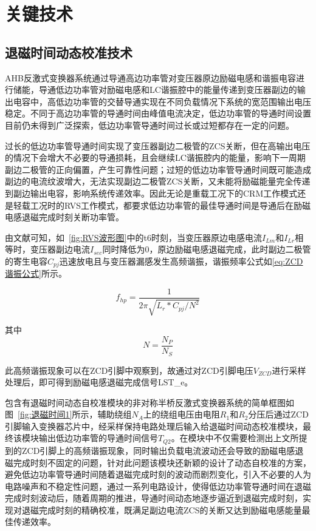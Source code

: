 \section{关键技术}

\subsection{退磁时间动态校准技术}

AHB反激式变换器系统通过导通高边功率管对变压器原边励磁电感和谐振电容进行储能，导通低边功率管对励磁电感和LC谐振腔中的能量传递到变压器副边的输出电容中，高低边功率管的交替导通实现在不同负载情况下系统的宽范围输出电压稳定。不同于高边功率管的导通时间由峰值电流决定，低边功率管的导通时间设置目前仍未得到广泛探索，低边功率管导通时间过长或过短都存在一定的问题。

过长的低边功率管导通时间实现了变压器副边二极管的ZCS关断，但在高输出电压的情况下会增大不必要的导通损耗，且会继续LC谐振腔内的能量，影响下一周期副边二极管的正向偏置，产生可靠性问题；过短的低边功率管导通时间既可能造成副边的电流纹波增大，无法实现副边二极管ZCS关断，又未能将励磁能量完全传递到副边输出电容，影响系统传递效率。因此无论是重载工况下的CRM工作模式还是轻载工况时的RVS工作模式，都要求低边功率管的最佳导通时间是导通后在励磁电感退磁完成时刻关断功率管。

由文献可知，如~\ref{fig:RVS波形图}中的t6时刻，当变压器原边电感电流$I_{Lm}$和$I_{Lr}$相等时，变压器副边电流$I_{sec}$同时降低为0，原边励磁电感退磁完成，此时副边二极管的寄生电容$C_{pj}$迅速放电且与变压器漏感发生高频谐振，谐振频率公式如\eqref{eq:ZCD谐振公式}所示。

\begin{equation}
    \label{eq:ZCD谐振公式}
    f_{hp} = \frac{1}{2\pi \sqrt{L_r * C_{pj}/N^2}}
\end{equation}

其中 
\begin{equation}
    \label{eq:变压器匝比}
    N=\frac{N_P}{N_S}
\end{equation}

此高频谐振现象可以在ZCD引脚中观察到，故通过对ZCD引脚电压$V_{ZCD}$进行采样处理后，即可得到励磁电感退磁完成信号LST\_e。

包含有退磁时间动态自校准模块的非对称半桥反激式变换器系统的简单框图如图~\ref{fig:退磁时间1}所示，辅助绕组$N_A$上的绕组电压由电阻$R_1$和$R_2$分压后通过ZCD引脚输入变换器芯片中，经采样保持电路处理后输入给退磁时间动态校准模块，最终该模块输出低边功率管的导通时间信号$T_{Q2}$。在模块中不仅需要检测出上文所提到的ZCD引脚上的高频谐振现象，同时输出负载电流波动还会导致的励磁电感退磁完成时刻不固定的问题，针对此问题该模块还新颖的设计了动态自校准的方案，避免低边功率管导通时间随着退磁完成时刻的波动而剧烈变化，引入不必要的人为电路噪声和不稳定性问题，通过一系列电路设计，使得低边功率管导通时间在退磁完成时刻波动后，随着周期的推进，导通时间动态地逐步逼近到退磁完成时刻，实现对退磁完成时刻的精确校准，既满足副边电流ZCS的关断又达到励磁电感能量最佳传递效率。

